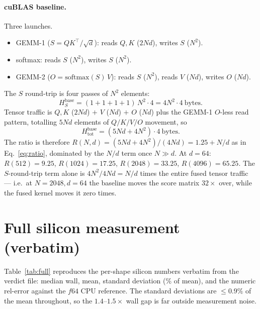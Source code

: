 \documentclass[11pt,a4paper]{article}
\begin{document}
\paragraph{cuBLAS baseline.} Three launches.
\begin{itemize}
\item GEMM-1 ($S=QK^\top/\sqrt{d}$): reads $Q,K$ ($2Nd$), writes $S$ ($N^2$).
\item softmax: reads $S$ ($N^2$), writes $S$ ($N^2$).
\item GEMM-2 ($O=\mathrm{softmax}(S)\,V$): reads $S$ ($N^2$), reads $V$ ($Nd$),
  writes $O$ ($Nd$).
\end{itemize}
The $S$ round-trip is four passes of $N^2$ elements:
\begin{equation}
  H^{\mathrm{base}}_S = (1+1+1+1)\,N^2 \cdot 4 = 4N^2\cdot 4~\text{bytes}.
\end{equation}
Tensor traffic is $Q,K$ ($2Nd$) $+$ $V$ ($Nd$) $+$ $O$ ($Nd$) plus the GEMM-1
$O$-less read pattern, totalling $5Nd$ elements of $Q/K/V/O$ movement, so
\begin{equation}
  H^{\mathrm{base}}_{\mathrm{tot}} = (5Nd + 4N^2)\cdot 4~\text{bytes}.
\end{equation}
The ratio is therefore $R(N,d) = (5Nd+4N^2)/(4Nd) = 1.25 + N/d$ as in
Eq.~\eqref{eq:ratio}, dominated by the $N/d$ term once $N \gg d$. At $d{=}64$:
$R(512)=9.25$, $R(1024)=17.25$, $R(2048)=33.25$, $R(4096)=65.25$. The
$S$-round-trip term alone is $4N^2/4Nd = N/d$ times the entire fused tensor
traffic --- i.e.\ at $N{=}2048,d{=}64$ the baseline moves the score matrix
$32\times$ over, while the fused kernel moves it zero times.

\section{Full silicon measurement (verbatim)}
\label{app:silicon}

Table~\ref{tab:full} reproduces the per-shape silicon numbers verbatim from the
verdict file: median wall, mean, standard deviation (\% of mean), and the
numeric rel-error against the $f64$ CPU reference. The standard deviations are
$\leq 0.9\%$ of the mean throughout, so the $1.4$--$1.5\times$ wall gap is far
outside measurement noise.
\end{document}
